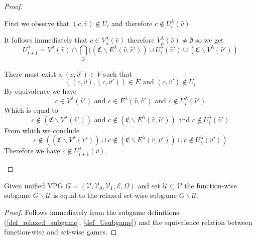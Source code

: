 \begin{lemma}
\begin{proof}
\begin{itemize}
			First we observe that $(c,\hat{v}) \notin U_i$ and therefore $c \notin U^\lambda_i(\hat{v})$.
			
			It follows immediately that $c \in V^\lambda_{\overline{\alpha}}(\hat{v})$ therefore $V^\lambda_{\overline{\alpha}}(\hat{v}) \neq \emptyset$ so we get
			\[ U^\lambda_{i+1} =V^\lambda(\hat{v}) \cap \bigcap_{\hat{v'}}((\mathfrak{C} \backslash E^\lambda(\hat{v},\hat{v}')) \cup U^\lambda_i(\hat{v}') \cup (\mathfrak{C}\backslash V^\lambda(\hat{v}')) \]
			
			There must exist a $(c,\hat{v}') \in V$ such that 
			\[ ((c,\hat{v}),(c,\hat{v}')) \in E  \text{ and } (c,\hat{v}') \notin U_i \]
			By equivalence we have 
			\[ c \in V^\lambda(\hat{v}')  \text{ and } c \in E^\lambda(\hat{v},\hat{v}')  \text{ and } c \notin U^\lambda_i(\hat{v}') \]
			Which is equal to
			\[ c \notin (\mathfrak{C} \backslash V^\lambda(\hat{v}'))  \text{ and } c \notin (\mathfrak{C} \backslash E^\lambda(\hat{v},\hat{v}'))  \text{ and } c \notin U^\lambda_i(\hat{v}') \]
			From which we conclude
			\[ c \notin ((\mathfrak{C} \backslash V^\lambda(\hat{v}')) \cup c \notin (\mathfrak{C} \backslash E^\lambda(\hat{v},\hat{v}')) \cup c \notin U^\lambda_i(\hat{v}')) \]
			Therefore we have $c \notin U^\lambda_{i+1}(\hat{v})$.
		\end{itemize}
	\end{proof}
\end{lemma}
\begin{lemma}
	\label{lem_subgame_eq}
	Given unified VPG $G = (\mathcal{V},\mathcal{V}_0,\mathcal{V}_1, \mathcal{E}, \Omega)$ and set $\mathcal{U} \subseteq \mathcal{V}$ the function-wise subgame $G \backslash \mathcal{U}$ is equal to the relaxed set-wise subgame $G \backslash \mathcal{U}$.
	\begin{proof}
		Follows immediately from the subgame definitions (\ref{def_relaxed_subgame}, \ref{def_Usubgame}) and the equivalence relation between function-wise and set-wise games.
	\end{proof}
\end{lemma}

